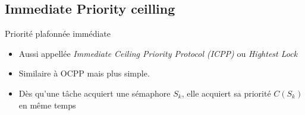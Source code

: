 \subsection{Immediate Priority ceilling}

\begin{frame}{Priorité plafonnée immédiate}
  \begin{itemize}
  \item  Aussi  appellée  \emph{Immediate  Ceiling  Priority  Protocol
      (ICPP)} ou \emph{Hightest Lock}
  \item Similaire à OCPP mais plus simple.
  \item Dès  qu'une tâche acquiert une sémaphore  $S_k$, elle acquiert
    sa priorité $C(S_k)$ en même temps
  \end{itemize}
\end{frame}

